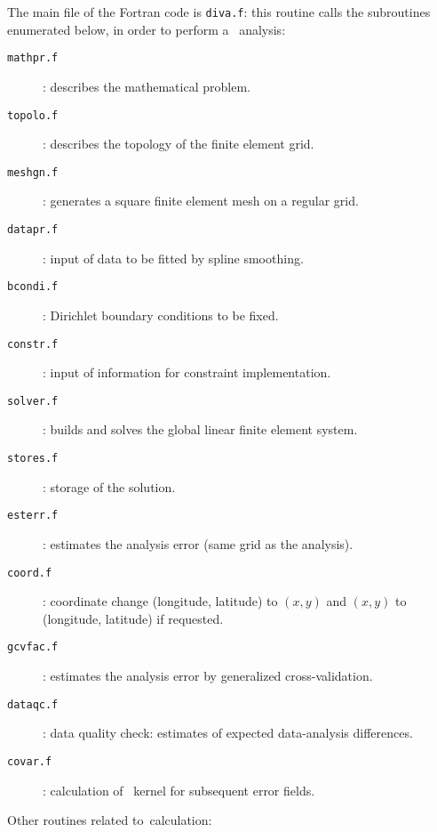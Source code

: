 The main file of the Fortran code is \texttt{diva.f}: this routine calls the subroutines enumerated below, in order to perform a \diva\, analysis:
\vspace{.15cm}
\begin{description}
\item[\texttt{mathpr.f}]: describes the mathematical problem.
\item[\texttt{topolo.f}]: describes the topology of the finite element grid.
\item[\texttt{meshgn.f}]: generates a square finite element mesh on a regular grid.
\item[\texttt{datapr.f}]: input of data to be fitted by spline smoothing.
\item[\texttt{bcondi.f}]: Dirichlet boundary conditions to be fixed.
\item[\texttt{constr.f}]: input of information for constraint implementation.
\item[\texttt{solver.f}]: builds and solves the global linear finite element system.
\item[\texttt{stores.f}]: storage of the solution.
\item[\texttt{esterr.f}]: estimates the analysis error (same grid as the analysis).
\item[\texttt{coord.f}]: coordinate change (longitude, latitude) to $(x,y)$ and $(x,y)$ to (longitude, latitude) if requested.
\item[\texttt{gcvfac.f}]: estimates the analysis error by generalized cross-validation.  
\item[\texttt{dataqc.f}]: data quality check: estimates of expected data-analysis differences.   
\item[\texttt{covar.f}]: calculation of \diva\, kernel for subsequent error fields.        
\end{description}
\vspace{.15cm}
Other routines related to \diva\,calculation:
